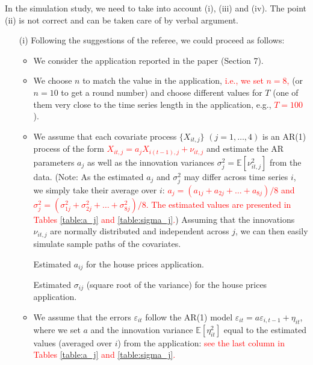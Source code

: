 \documentclass[a4paper,12pt]{article}
\begin{document}
\begin{enumerate}[label=\arabic*.,leftmargin=0.6cm]
{\color{blue}  
In the simulation study, we need to take into account (i), (iii) and (iv). The point (ii) is not correct and can be taken care of by verbal argument.
\begin{itemize}[topsep=0pt]
 
\item[(i)] Following the suggestions of the referee, we could proceed as follows:

\begin{itemize}[label=--,leftmargin=0.45cm,itemsep=0pt]

\item We consider the application reported in the paper (Section 7).

\item We choose $n$ to match the value in the application, \textcolor{red}{i.e., we set $n = 8$,} (or $n=10$ to get a round number) and choose different values for $T$ (one of them very close to the time series length in the application, e.g., \textcolor{red}{$T=100$}). 

\item We assume that each covariate process $\{X_{it,j}\}$ $(j=1,\ldots,4)$ is an AR(1) process of the form %
\textcolor{red}{$X_{it,j} = a_{j} X_{i(t-1),j} + \nu_{it,j}$}
 and estimate the AR parameters $a_{j}$ as well as the innovation variances $\sigma^2_{j} = \mathbb{E}[\nu_{it,j}^2]$ from the data. (Note: As the estimated $a_j$ and $\sigma_j^2$ may differ across time series $i$, we simply take their average over $i$: \textcolor{red}{$a_j = (a_{1j} + a_{2j} + \ldots + a_{8j})/8$ and $\sigma^2_j = (\sigma^2_{1j} + \sigma^2_{2j} + \ldots + \sigma^2_{8j})/8$. The estimated values are presented in Tables \ref{table:a_j} and \ref{table:sigma_j}.}) Assuming that the innovations $\nu_{it,j}$ are normally distributed and independent across $j$, we can then easily simulate sample paths of the covariates.
 
\begin{table}
\centering

\caption{Estimated $a_{ij}$ for the house prices application.}\label{table:a_j}
\end{table}

\begin{table}
\centering

\caption{Estimated $\sigma_{ij}$ (square root of the variance) for the house prices application.}\label{table:sigma_j}
\end{table}

\item We assume that the errors $\varepsilon_{it}$ follow the AR(1) model $\varepsilon_{it} = a \varepsilon_{i, t-1} + \eta_{it}$, where we set $a$ and the innovation variance $\mathbb{E}[\eta_{it}^2]$ equal to the estimated values (averaged over $i$) from the application: \textcolor{red}{see the last column in Tables \ref{table:a_j} and \ref{table:sigma_j}.} 


\end{itemize}
\end{itemize}}
\end{enumerate}
\end{document}
